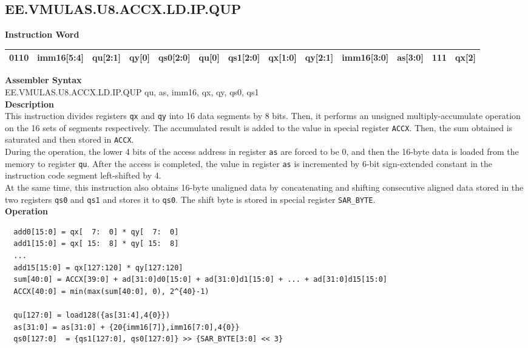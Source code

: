 \clearpage
\subsection{EE.VMULAS.U8.ACCX.LD.IP.QUP}\label{instruction:EEVMULASU8ACCXLDIPQUP}
\setlength\tabcolsep{5pt}
\textbf{Instruction Word} \\
\begin{tabular}{|c|c|c|c|c|c|c|c|c|c|c|c|c|}
	\hline
	0110 & imm16[5:4] & qu[2:1] & qy[0] & qs0[2:0] & qu[0] & qs1[2:0] & qx[1:0] & qy[2:1] & imm16[3:0] & as[3:0] & 111 & qx[2] \\
	\hline
\end{tabular}

\textbf{Assembler Syntax} \\
EE.VMULAS.U8.ACCX.LD.IP.QUP qu, as, imm16, qx, qy, qs0, qs1 \\
\textbf{Description} \\
This instruction divides registers \lstinline{qx} and \lstinline{qy} into 16 data segments by 8 bits. Then, it performs an unsigned multiply-accumulate operation on the 16 sets of segments respectively. The accumulated result is added to the value in special register \lstinline{ACCX}. Then, the sum obtained is saturated and then stored in \lstinline{ACCX}.\\
During the operation, the lower 4 bits of the access address in register \lstinline{as} are forced to be 0, and then the 16-byte data is loaded from the memory to register \lstinline{qu}. After the access is completed, the value in register \lstinline{as} is incremented by 6-bit sign-extended constant in the instruction code segment left-shifted by 4.\\
At the same time, this instruction also obtains 16-byte unaligned data by concatenating and shifting consecutive aligned data stored in the two registers \lstinline{qs0} and \lstinline{qs1} and stores it to \lstinline{qs0}. The shift byte is stored in special register \lstinline{SAR_BYTE}.\\
\textbf{Operation}
\begin{lstlisting}
  add0[15:0] = qx[  7:  0] * qy[  7:  0]
  add1[15:0] = qx[ 15:  8] * qy[ 15:  8]
  ...
  add15[15:0] = qx[127:120] * qy[127:120]
  sum[40:0] = ACCX[39:0] + ad[31:0]d0[15:0] + ad[31:0]d1[15:0] + ... + ad[31:0]d15[15:0]
  ACCX[40:0] = min(max(sum[40:0], 0), 2^{40}-1)

  qu[127:0] = load128({as[31:4],4{0}})
  as[31:0] = as[31:0] + {20{imm16[7]},imm16[7:0],4{0}}
  qs0[127:0]  = {qs1[127:0], qs0[127:0]} >> {SAR_BYTE[3:0] << 3}
\end{lstlisting}

